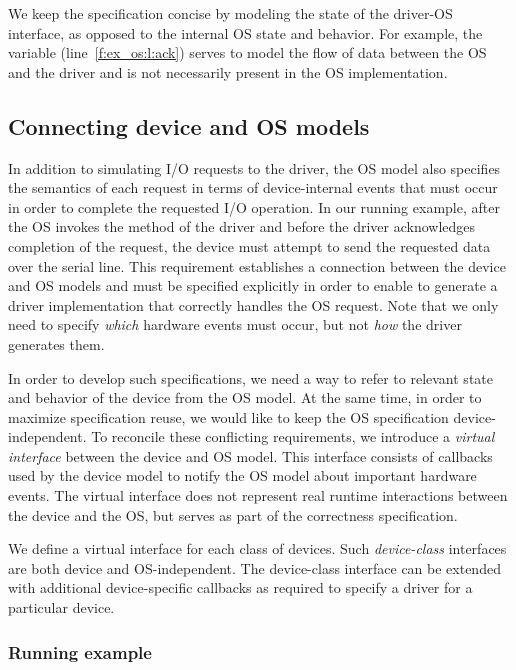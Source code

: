 We keep the specification concise by modeling the state of the driver-OS interface, as opposed to the internal OS state and behavior.  For example, the  variable (line~\ref{f:ex_os:l:ack}) serves to model the flow of data between the OS and the driver and is not necessarily present in the OS implementation.

\subsection{Connecting device and OS models}
\label{s:virt}

In addition to simulating I/O requests to the driver, the OS model also specifies the semantics of each request in terms of device-internal events that must occur in order to complete the requested I/O operation.  In our running example, after the OS invokes the  method of the driver and before the driver acknowledges completion of the request, the device must attempt to send the requested data over the serial line.  This requirement establishes a connection between the device and OS models and must be specified explicitly in order to enable \termite to generate a driver implementation that correctly handles the OS request.  Note that we only need to specify \emph{which} hardware events must occur, but not \emph{how} the driver generates them.

In order to develop such specifications, we need a way to refer to relevant state and behavior of the device from the OS model.  At the same time, in order to maximize specification reuse, we would like to keep the OS specification device-independent.  To reconcile these conflicting requirements, we introduce a \emph{virtual interface} between the device and OS model.  This interface consists of callbacks used by the device model to notify the OS model about important hardware events.  The virtual interface does not represent real runtime interactions between the device and the OS, but serves as part of the correctness specification.

We define a virtual interface for each class of devices.  Such \emph{device-class} interfaces are both device and OS-independent.  The device-class interface can be extended with additional device-specific callbacks as required to specify a driver for a particular device.

\subsubsection{Running example}

